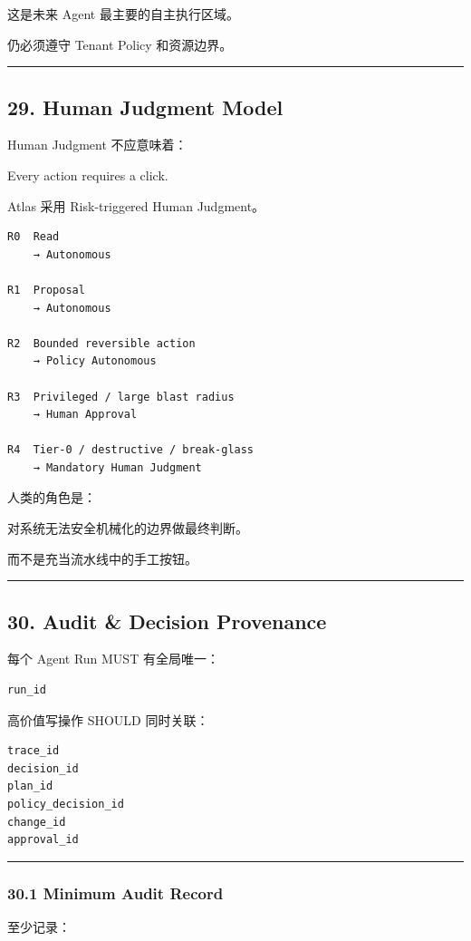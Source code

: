 \documentclass[11pt,a4paper]{article}
\begin{document}
这是未来 Agent 最主要的自主执行区域。

仍必须遵守 Tenant Policy 和资源边界。

\vspace{0.5em}\hrule\vspace{0.5em}
\subsection{29. Human Judgment Model}
Human Judgment 不应意味着：

\begin{gfmBlockquote}
Every action requires a click.
\end{gfmBlockquote}
Atlas 采用 Risk-triggered Human Judgment。

\begin{lstlisting}[language=text]
R0  Read
    → Autonomous

R1  Proposal
    → Autonomous

R2  Bounded reversible action
    → Policy Autonomous

R3  Privileged / large blast radius
    → Human Approval

R4  Tier-0 / destructive / break-glass
    → Mandatory Human Judgment
\end{lstlisting}
人类的角色是：

\begin{gfmBlockquote}
对系统无法安全机械化的边界做最终判断。
\end{gfmBlockquote}
而不是充当流水线中的手工按钮。

\vspace{0.5em}\hrule\vspace{0.5em}
\subsection{30. Audit \& Decision Provenance}
每个 Agent Run MUST 有全局唯一：

\begin{lstlisting}[language=text]
run_id
\end{lstlisting}
高价值写操作 SHOULD 同时关联：

\begin{lstlisting}[language=text]
trace_id
decision_id
plan_id
policy_decision_id
change_id
approval_id
\end{lstlisting}
\vspace{0.5em}\hrule\vspace{0.5em}
\subsubsection{30.1 Minimum Audit Record}
至少记录：
\end{document}
